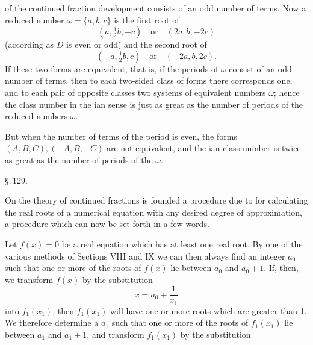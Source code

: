 of the continued fraction development consists of an odd number
of terms. Now a reduced number $\omega = \{a, b, c\}$ is the first
root of
\[
(a, \tfrac{1}{2}b, -c) \quad \text{or} \quad (2a, b, -2c)
\]
(according as $D$ is even or odd) and the second root of
\[
(-a, \tfrac{1}{2}b, c) \quad \text{or} \quad (-2a, b, 2c).
\]
If these two forms are equivalent, that is, if the periods
of $\omega$ consist of an odd number of terms, then to each
two-sided class of forms there corresponds one, and to each pair of
opposite classes two systems of equivalent numbers $\omega$; hence
the class number in the ian sense is just as great as the
number of periods of the reduced numbers $\omega$.

But when the number of terms of the period is even, the
forms $(A, B, C), (-A, B, -C)$ are not equivalent, and the
ian class number is twice as great as the number of
periods of the $\omega$.

\begin{center}
\S.\,129.

\end{center}

On the theory of continued fractions is founded a procedure
due to  for calculating the real roots
of a numerical equation with any desired degree of approximation,
a procedure which can now be set forth in a few words.

Let $f(x) = 0$ be a real equation which has at least one
real root. By one of the various methods of Sections
VIII and IX we can then always find an integer
$a_0$ such that one or more of the roots of $f(x)$ lie between
$a_0$ and $a_0 + 1$. If, then, we transform $f(x)$ by
the substitution
\[
x = a_0 + \frac{1}{x_1}
\]
into $f_1(x_1)$, then $f_1(x_1)$ will have one or more roots which are
greater than 1. We therefore determine a 
$a_1$ such that one or more of the roots
of $f_1(x_1)$ lie between $a_1$ and $a_1 + 1$, and transform $f_1(x_1)$ by the
substitution
